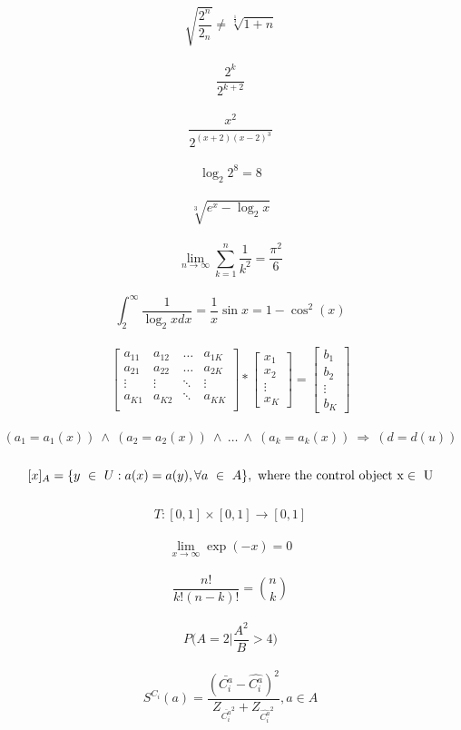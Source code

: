 \documentclass[a4paper]{article}
\begin{document}
$$ \sqrt{ \frac{2^{n}}{2_n}} \neq \sqrt[\frac{1}{3}]{1+n} $$
\\
$$ \frac{2^{k}}{2^{k+2}}$$
\\
$$ \frac{x^{2}}{2^{(x+2)(x-2)^{3}}}$$
\\
$$ \log_{2}{2^{8}} = 8$$
\\
$$ \sqrt[3]{e^{x}-\log_{2}{x}}$$
\\
$$\lim_{n\to\infty}\sum_{k=1}^{n}\frac{1}{k^{2}} = \frac{\pi^{2}}{6}$$
\\
$$\int_{2}^{\infty}\frac{1}{\log_2{x}dx}=\frac{1}{x}\sin x = 1 - \cos^{2}(x)$$
\\

$$\left[ \begin{array}{cccc}
a_{11} & a_{12} & \ldots &a_{1K} \\
a_{21} & a_{22} & \ldots &a_{2K}\\
\vdots & \vdots & \ddots &\vdots\\
a_{K1} & a_{K2} & \ddots & a_{KK} \\
\end{array} \right]
*
\left [\begin{array}{c}
x_{1}\\x_{2}\\\vdots \\x_{K}
\end{array} \right] =
\left [\begin{array}{c}
b_{1}\\b_{2}\\\vdots \\b_{K}
\end{array} \right]$$
\\
$$ (a_{1} = a_{1}(x)) \ \wedge\ (a_{2}=a_{2}(x)) \ \wedge \ \ldots \ \wedge \ (a_{k} = a_{k}(x)) \ \Rightarrow \ (d = d(u)) $$
\\
$$ [x]_{A} = \{y \ \in \ U :a(x) = a(y),\forall a \ \in \  A\}, \ { \rm where \  the \  control \ object \  x \in \ U } $$
\\
$$ T : [0,1] \times [0,1] \to [0,1] $$
\\
$$ \lim_{x \to \infty} \exp{(-x)} = 0$$
\\
$$
\frac{n!}{k!(n-k)!} = {n \choose k}$$
\\
$$
P\bigg(A = 2 \bigg | \frac{A^{2}}{B} > 4\bigg)$$
\\
$$ S^{C_i}(a) = \frac{(\bar{C^a_i}-\hat{C^a_i})^2}{Z_{\bar{C^a_i}^2}+Z_{\hat{C^a_i}^2}}, a \in A $$
\end{document}
